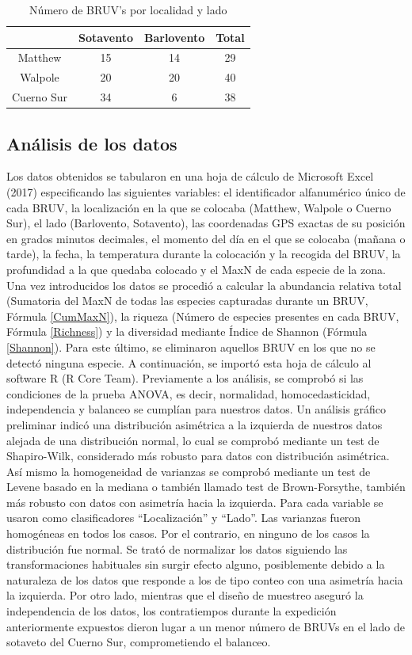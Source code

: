 \documentclass[a4paper, 11pt]{article}
\begin{document}
\begin{table}[htbp]
\begin{center}
\begin{tabular}{|c|c|c|c|}
\hline
 & Sotavento & Barlovento & Total\\
\hline
Matthew & 15 & 14 & 29\\
Walpole & 20 & 20 & 40\\
Cuerno Sur & 34 & 6 & 38\\
\hline
\end{tabular}
\caption{Número de BRUV's por localidad y lado}
\label{tabla:1}
\end{center}
\end{table}

\subsection{Análisis de los datos}
Los datos obtenidos se tabularon en una hoja de cálculo de Microsoft Excel (2017) especificando las siguientes variables: el identificador alfanumérico único de cada BRUV, la localización en la que se colocaba (Matthew, Walpole o Cuerno Sur), el lado (Barlovento, Sotavento), las coordenadas GPS exactas de su posición en grados minutos decimales, el momento del día en el que se colocaba (mañana o tarde), la fecha, la temperatura durante la colocación y la recogida del BRUV, la profundidad a la que quedaba colocado y el MaxN de cada especie de la zona.
Una vez introducidos los datos se procedió a calcular la abundancia relativa total (Sumatoria del MaxN de todas las especies capturadas durante un BRUV, Fórmula \ref{CumMaxN}), la riqueza (Número de especies presentes en cada BRUV, Fórmula \ref{Richness}) y la diversidad mediante Índice de Shannon (Fórmula \ref{Shannon}). Para este último, se eliminaron aquellos BRUV en los que no se detectó ninguna especie.
A continuación, se importó esta hoja de cálculo al software R (R Core Team). Previamente a los análisis, se comprobó si las condiciones de la prueba ANOVA, es decir, normalidad, homocedasticidad, independencia y balanceo se cumplían para nuestros datos. Un análisis gráfico preliminar indicó una distribución asimétrica a la izquierda de nuestros datos alejada de una distribución normal, lo cual se comprobó mediante un test de Shapiro-Wilk, considerado más robusto para datos con distribución asimétrica. Así mismo la homogeneidad de varianzas se comprobó mediante un test de Levene basado en la mediana o también llamado test de Brown-Forsythe, también más robusto con datos con asimetría hacia la izquierda. Para cada variable se usaron como clasificadores “Localización” y “Lado”. Las varianzas fueron homogéneas en todos los casos. Por el contrario, en ninguno de los casos la distribución fue normal. Se trató de normalizar los datos siguiendo las transformaciones habituales sin surgir efecto alguno, posiblemente debido a la naturaleza de los datos que responde a los de tipo conteo con una asimetría hacia la izquierda. Por otro lado, mientras que el diseño de muestreo aseguró la independencia de los datos, los contratiempos durante la expedición anteriormente expuestos dieron lugar a un menor número de BRUVs en el lado de sotaveto del Cuerno Sur, comprometiendo el balanceo.
\end{document}
